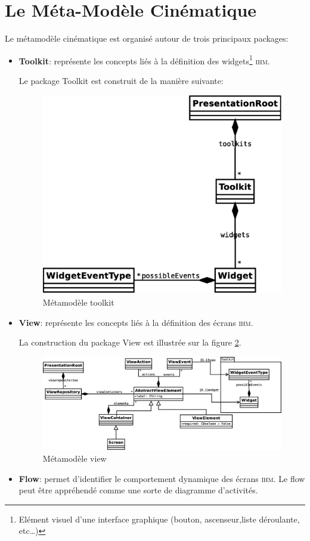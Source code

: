 \section{Le Méta-Modèle Cinématique}
Le métamodèle cinématique est organisé autour de trois principaux packages:
\begin{itemize}
  \item \textbf{Toolkit}: représente les concepts liés à la définition des widgets\footnote{Elément visuel d'une interface graphique (bouton, ascenseur,liste déroulante, etc\dots)} \textsc{ihm}.

Le package Toolkit est construit de la manière suivante:

\begin{figure}[htb]
  \centering
  \includegraphics[scale=.3]{img/toolkit.eps}
  \caption{Métamodèle toolkit}
  \label{fig:toolkit}
\end{figure}
  \item \textbf{View}: représente les concepts liés à la définition des écrans \textsc{ihm}.

La construction du package View est illustrée sur la figure \ref{fig:view}.
\begin{figure}[H]
  \centering
  \includegraphics[scale=.3]{img/view.eps}
  \caption{Métamodèle view}
  \label{fig:view}
\end{figure}
  \item \textbf{Flow}: permet d'identifier le comportement dynamique des écrans \textsc{ihm}. Le flow peut être appréhendé comme une sorte de diagramme d'activités.


\end{itemize}
